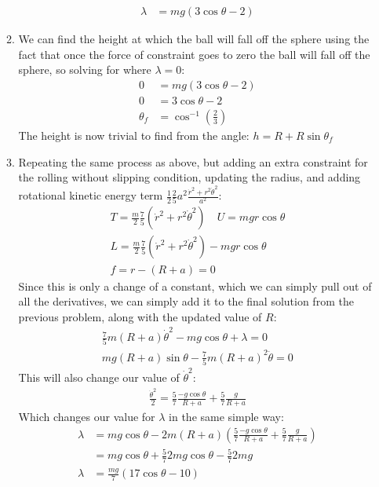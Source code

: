 \documentclass[12pt]{article}
\begin{document}
\begin{enumerate}
\begin{enumerate}
\begin{align*}
        \lambda &=mg(3\cos\theta-2)
      \end{align*}
      \item We can find the height at which the ball will fall off the sphere using the fact that once the force of constraint goes to zero the ball will fall off the sphere, so solving for where $\lambda=0$:
      \begin{align*}
        0&=mg(3\cos\theta-2)\\
        0&=3\cos\theta-2\\
        \theta_f&=\cos^{-1}\left(\frac{2}{3}\right)
      \end{align*}
      The height is now trivial to find from the angle: $h=R+R\sin\theta_f$
      \item Repeating the same process as above, but adding an extra constraint for the rolling without slipping condition, updating the radius, and adding rotational kinetic energy term $\frac{1}{2}\frac{2}{5}a^2\frac{\dot{r}^2+r^2\dot{\theta}^2}{a^2}$:
      \begin{gather*}
        T=\frac{m}{2}\frac{7}{5}\left(\dot{r}^2+r^2\dot{\theta}^2\right)\quad U=mgr\cos\theta\\
        L=\frac{m}{2}\frac{7}{5}\left(\dot{r}^2+r^2\dot{\theta}^2\right)-mgr\cos\theta\\
        f=r-(R+a)=0
      \end{gather*}
      Since this is only a change of a constant, which we can simply pull out of all the derivatives, we can simply add it to the final solution from the previous problem, along with the updated value of $R$:
      \begin{gather*}
        \frac{7}{5}m(R+a)\dot{\theta}^2-mg\cos\theta+\lambda=0\\
        mg(R+a)\sin\theta-\frac{7}{5}m(R+a)^2\ddot{\theta}=0
      \end{gather*}
      This will also change our value of $\dot{\theta}^2$:
      \begin{gather*}
        \frac{\dot{\theta}^2}{2}=\frac{5}{7}\frac{-g\cos\theta}{R+a}+\frac{5}{7}\frac{g}{R+a}
      \end{gather*}
      Which changes our value for $\lambda$ in the same simple way:
      \begin{align*}
        \lambda&=mg\cos\theta-2m(R+a)\left( \frac{5}{7}\frac{-g\cos\theta}{R+a}+\frac{5}{7}\frac{g}{R+a} \right)\\
        &=mg\cos\theta+\frac{5}{7}2mg\cos\theta-\frac{5}{7}2mg\\
        \lambda &=\frac{mg}{7}(17\cos\theta-10)

\end{align*}
\end{enumerate}
\end{enumerate}
\end{document}

